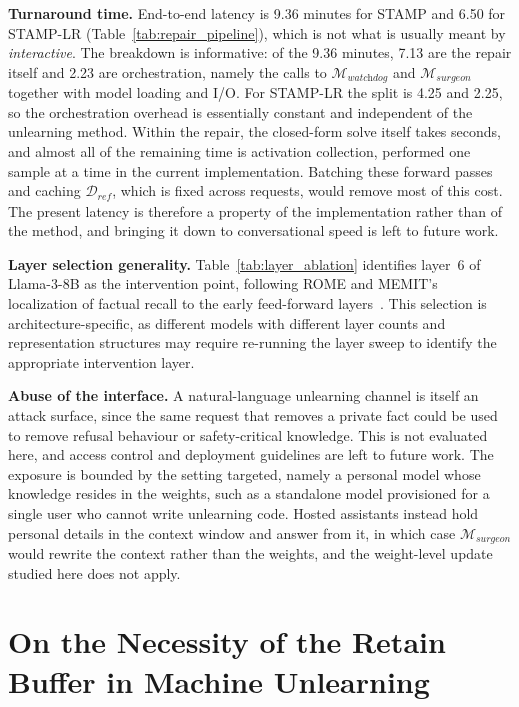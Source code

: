 \medskip
\noindent
\textbf{Turnaround time.} End-to-end latency is 9.36 minutes for STAMP and 6.50 for STAMP-LR (Table~\ref{tab:repair_pipeline}), which is not what is usually meant by \textit{interactive}. The breakdown is informative: of the 9.36 minutes, 7.13 are the repair itself and 2.23 are orchestration, namely the calls to $\mathcal{M}_{\textit{watchdog}}$ and $\mathcal{M}_{\textit{surgeon}}$ together with model loading and I/O. For STAMP-LR the split is 4.25 and 2.25, so the orchestration overhead is essentially constant and independent of the unlearning method. Within the repair, the closed-form solve itself takes seconds, and almost all of the remaining time is activation collection, performed one sample at a time in the current implementation. Batching these forward passes and caching $\mathcal{D}_{\textit{ref}}$, which is fixed across requests, would remove most of this cost. The present latency is therefore a property of the implementation rather than of the method, and bringing it down to conversational speed is left to future work.

\medskip
\noindent
\textbf{Layer selection generality.} Table~\ref{tab:layer_ablation} identifies layer~6 of Llama-3-8B as the intervention point, following ROME and MEMIT's localization of factual recall to the early feed-forward layers~\citeauthor{meng2022locating,meng2022mass}. This selection is architecture-specific, as different models with different layer counts and representation structures may require re-running the layer sweep to identify the appropriate intervention layer.

\medskip
\noindent
\textbf{Abuse of the interface.} A natural-language unlearning channel is itself an attack surface, since the same request that removes a private fact could be used to remove refusal behaviour or safety-critical knowledge. This is not evaluated here, and access control and deployment guidelines are left to future work. The exposure is bounded by the setting targeted, namely a personal model whose knowledge resides in the weights, such as a standalone model provisioned for a single user who cannot write unlearning code. Hosted assistants instead hold personal details in the context window and answer from it, in which case $\mathcal{M}_{\textit{surgeon}}$ would rewrite the context rather than the weights, and the weight-level update studied here does not apply.


\section{On the Necessity of the Retain Buffer in Machine Unlearning}\label{sec:disc_retain}

